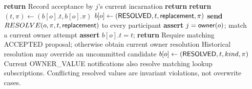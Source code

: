 \begin{algorithm}[p]
\caption{Owner decision and resolution receipt}
\begin{algorithmic}[1]
    \State \textbf{return}
  \EndIf
  \State Record acceptance by $j$'s current incarnation
  \State {}
\EndProcedure
\Statex
{}
    \State \textbf{return}
  \EndIf
    \State \textbf{return}
  \EndIf
  \State $(t,\pi)\gets(b[o].t,b[o].\pi)$
  \State $b[o]\gets(\mathsf{RESOLVED},t,\mathsf{replacement},\pi)$
  \State \textbf{send} $RESOLVE(o,\pi,t,\mathsf{replacement})$ to every participant
  \State {}
\EndProcedure
\Statex
{}
  \State \textbf{assert} $j=\mathsf{owner}(o)$; match a current owner attempt
    \State \textbf{assert} $b[o].t=t$; \textbf{return}
  \EndIf
    \State Require matching ACCEPTED proposal; otherwise obtain current owner resolution
  \EndIf
  \State Historical resolution may override an uncommitted candidate
  \State $b[o]\gets(\mathsf{RESOLVED},t,kind,\pi)$
\EndProcedure
\Statex Current OWNER\_VALUE notifications also resolve matching lookup subscriptions.
\Statex Conflicting resolved values are invariant violations, not overwrite cases.
\end{algorithmic}
\end{algorithm}

